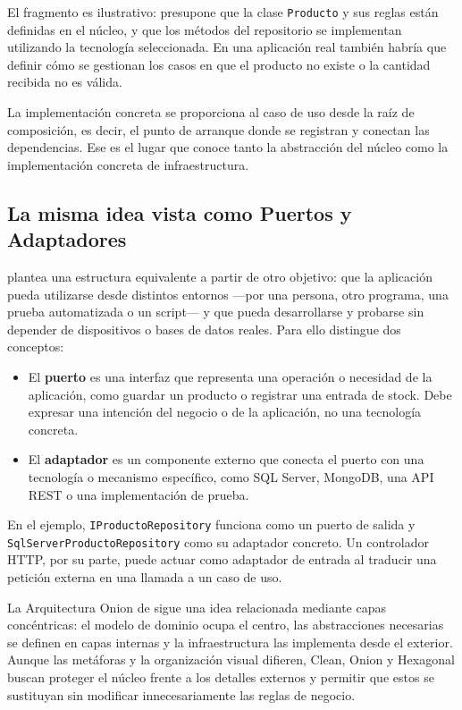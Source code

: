 El fragmento es ilustrativo: presupone que la clase \texttt{Producto} y sus reglas están definidas en el núcleo, y que los métodos del repositorio se implementan utilizando la tecnología seleccionada. En una aplicación real también habría que definir cómo se gestionan los casos en que el producto no existe o la cantidad recibida no es válida.

La implementación concreta se proporciona al caso de uso desde la raíz de composición, es decir, el punto de arranque donde se registran y conectan las dependencias. Ese es el lugar que conoce tanto la abstracción del núcleo como la implementación concreta de infraestructura.

\subsection{La misma idea vista como Puertos y Adaptadores}

\textcite{cockburn2005} plantea una estructura equivalente a partir de otro objetivo: que la aplicación pueda utilizarse desde distintos entornos —por una persona, otro programa, una prueba automatizada o un script— y que pueda desarrollarse y probarse sin depender de dispositivos o bases de datos reales. Para ello distingue dos conceptos:

\begin{itemize}
    \item El \textbf{puerto} es una interfaz que representa una operación o necesidad de la aplicación, como guardar un producto o registrar una entrada de stock. Debe expresar una intención del negocio o de la aplicación, no una tecnología concreta.

    \item El \textbf{adaptador} es un componente externo que conecta el puerto con una tecnología o mecanismo específico, como SQL Server, MongoDB, una API REST o una implementación de prueba.
\end{itemize}

En el ejemplo, \texttt{IProductoRepository} funciona como un puerto de salida y \texttt{SqlServer\-Producto\-Repository} como su adaptador concreto. Un controlador HTTP, por su parte, puede actuar como adaptador de entrada al traducir una petición externa en una llamada a un caso de uso.

La Arquitectura Onion de \textcite{palermo2008} sigue una idea relacionada mediante capas concéntricas: el modelo de dominio ocupa el centro, las abstracciones necesarias se definen en capas internas y la infraestructura las implementa desde el exterior. Aunque las metáforas y la organización visual difieren, Clean, Onion y Hexagonal buscan proteger el núcleo frente a los detalles externos y permitir que estos se sustituyan sin modificar innecesariamente las reglas de negocio.

